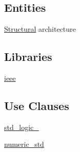 \subsection*{Entities}
\begin{DoxyCompactItemize}
\item 
\hyperlink{class_r_m_decoder_1_1_structural}{Structural} architecture
\end{DoxyCompactItemize}
\subsection*{Libraries}
 \begin{DoxyCompactItemize}
\item 
\hypertarget{class_r_m_decoder_ga0a6af6eef40212dbaf130d57ce711256}{\hyperlink{group___r_m_decoder_ga0a6af6eef40212dbaf130d57ce711256}{ieee} }\label{class_r_m_decoder_ga0a6af6eef40212dbaf130d57ce711256}

\end{DoxyCompactItemize}
\subsection*{Use Clauses}
 \begin{DoxyCompactItemize}
\item 
\hypertarget{class_r_m_decoder_gacd03516902501cd1c7296a98e22c6fcb}{\hyperlink{group___r_m_decoder_gacd03516902501cd1c7296a98e22c6fcb}{std\+\_\+logic\+\_}   }\label{class_r_m_decoder_gacd03516902501cd1c7296a98e22c6fcb}

\item 
\hypertarget{class_r_m_decoder_ga2edc34402b573437d5f25fa90ba4013e}{\hyperlink{group___r_m_decoder_ga2edc34402b573437d5f25fa90ba4013e}{numeric\+\_\+std}   }\label{class_r_m_decoder_ga2edc34402b573437d5f25fa90ba4013e}

\end{DoxyCompactItemize}
